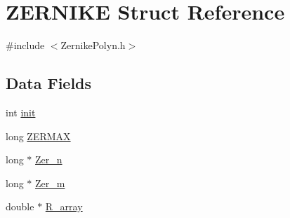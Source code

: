 \hypertarget{structZERNIKE}{\section{Z\+E\+R\+N\+I\+K\+E Struct Reference}
\label{structZERNIKE}
}


{\ttfamily \#include $<$Zernike\+Polyn.\+h$>$}

\subsection*{Data Fields}
\begin{DoxyCompactItemize}
\item 
int \hyperlink{structZERNIKE_aac9ea666bbfdae8b71b4bff01617b2c2}{init}
\item 
long \hyperlink{structZERNIKE_a2c37fde142f459b1374da2472151ee29}{Z\+E\+R\+M\+A\+X}
\item 
long $\ast$ \hyperlink{structZERNIKE_a9c1c566a6926ec5c5458614732c6d358}{Zer\+\_\+n}
\item 
long $\ast$ \hyperlink{structZERNIKE_a92c691d4081cb095e8f006335bf20f08}{Zer\+\_\+m}
\item 
double $\ast$ \hyperlink{structZERNIKE_ab54550ba1f67c3f7d31c9079dace1aa8}{R\+\_\+array}
\end{DoxyCompactItemize}


